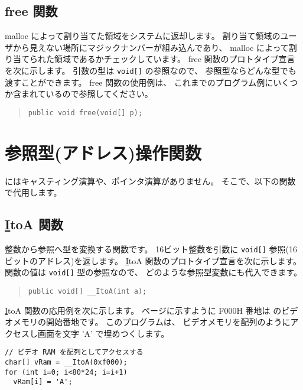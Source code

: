 \subsection{free 関数}

malloc によって割り当てた領域をシステムに返却します。
割り当て領域のユーザから見えない場所にマジックナンバーが組み込んであり、
malloc によって割り当てられた領域であるかチェックしています。
free 関数のプロトタイプ宣言を次に示します。
引数の型は \verb/void[]/ の参照なので、
参照型ならどんな型でも渡すことができます。
free 関数の使用例は、
これまでのプログラム例にいくつか含まれているので参照してください。

\begin{quote}
\begin{verbatim}
public void free(void[] p);
\end{verbatim}
\end{quote}

\section{参照型(アドレス)操作関数}

\cmml にはキャスティング演算や、ポインタ演算がありません。
そこで、以下の関数で代用します。

\subsection{\ul \ul ItoA 関数}
\label{chap4:itoa}

整数から参照へ型を変換する関数です。
16ビット整数を引数に \verb/void[]/ 参照(16ビットのアドレス)を返します。
\ul \ul ItoA 関数のプロトタイプ宣言を次に示します。
関数の値は \verb/void[]/ 型の参照なので、
どのような参照型変数にも代入できます。

\begin{quote}
\begin{verbatim}
public void[] __ItoA(int a);
\end{verbatim}
\end{quote}

\ul \ul ItoA 関数の応用例を次に示します。
\pageref{app:memmap}ページに示すように
F000H 番地は \tac のビデオメモリの開始番地です。
このプログラムは、
ビデオメモリを配列のようにアクセスし画面を文字 'A' で埋めつくします。

\begin{mylist}
\begin{verbatim}
// ビデオ RAM を配列としてアクセスする
char[] vRam = __ItoA(0xf000);
for (int i=0; i<80*24; i=i+1)
  vRam[i] = 'A';
\end{verbatim}
\end{mylist}

